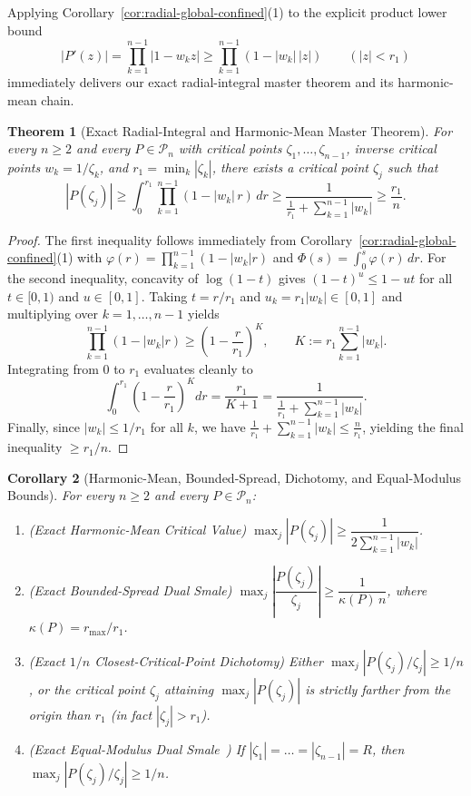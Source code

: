 \documentclass[11pt,a4paper]{article}
\newtheorem{theorem}{Theorem}[section]
\newtheorem{corollary}[theorem]{Corollary}
\theoremstyle{definition}
\theoremstyle{remark}
\begin{document}
Applying Corollary~\ref{cor:radial-global-confined}(1) to the explicit product lower bound
\[
|P'(z)| = \prod_{k=1}^{n-1} |1 - w_k z| \ge \prod_{k=1}^{n-1} (1 - |w_k|\, |z|) \qquad (|z| < r_1)
\]
immediately delivers our exact radial-integral master theorem and its harmonic-mean chain.

\begin{theorem}[Exact Radial-Integral and Harmonic-Mean Master Theorem]
\label{thm:exact-master}
For every $n \ge 2$ and every $P \in \mathcal{P}_n$ with critical points $\zeta_1, \dots, \zeta_{n-1}$, inverse critical points $w_k = 1/\zeta_k$, and $r_1 = \min_k |\zeta_k|$, there exists a critical point $\zeta_j$ such that
\begin{equation}
\label{eq:master-chain}
|P(\zeta_j)| \ge \int_0^{r_1} \prod_{k=1}^{n-1} (1 - |w_k|\, r)\, dr \ge \frac{1}{\frac{1}{r_1} + \sum_{k=1}^{n-1} |w_k|} \ge \frac{r_1}{n}.
\end{equation}
\end{theorem}

\begin{proof}
The first inequality follows immediately from Corollary~\ref{cor:radial-global-confined}(1) with $\varphi(r) = \prod_{k=1}^{n-1} (1 - |w_k| r)$ and $\Phi(s) = \int_0^s \varphi(r)\, dr$. For the second inequality, concavity of $\log(1 - t)$ gives $(1 - t)^u \le 1 - u t$ for all $t \in [0, 1)$ and $u \in [0, 1]$. Taking $t = r/r_1$ and $u_k = r_1 |w_k| \in [0, 1]$ and multiplying over $k = 1, \dots, n - 1$ yields
\[
\prod_{k=1}^{n-1} (1 - |w_k| r) \ge \left(1 - \frac{r}{r_1}\right)^K, \qquad K := r_1 \sum_{k=1}^{n-1} |w_k|.
\]
Integrating from $0$ to $r_1$ evaluates cleanly to
\[
\int_0^{r_1} \left(1 - \frac{r}{r_1}\right)^K dr = \frac{r_1}{K + 1} = \frac{1}{\frac{1}{r_1} + \sum_{k=1}^{n-1} |w_k|}.
\]
Finally, since $|w_k| \le 1/r_1$ for all $k$, we have $\frac{1}{r_1} + \sum_{k=1}^{n-1} |w_k| \le \frac{n}{r_1}$, yielding the final inequality $\ge r_1/n$.
\end{proof}

\begin{corollary}[Harmonic-Mean, Bounded-Spread, Dichotomy, and Equal-Modulus Bounds]
\label{cor:exact-corollaries}
For every $n \ge 2$ and every $P \in \mathcal{P}_n$:
\begin{enumerate}
\item \emph{(Exact Harmonic-Mean Critical Value)} $\max_j |P(\zeta_j)| \ge \dfrac{1}{2 \sum_{k=1}^{n-1} |w_k|}$.
\item \emph{(Exact Bounded-Spread Dual Smale)} $\max_j \left|\dfrac{P(\zeta_j)}{\zeta_j}\right| \ge \dfrac{1}{\kappa(P)\, n}$, where $\kappa(P) = r_{\max}/r_1$.
\item \emph{(Exact $1/n$ Closest-Critical-Point Dichotomy)} Either $\max_j |P(\zeta_j)/\zeta_j| \ge 1/n$, or the critical point $\zeta_j$ attaining $\max_j |P(\zeta_j)|$ is strictly farther from the origin than $r_1$ (in fact $|\zeta_j| > r_1$).
\item \emph{(Exact Equal-Modulus Dual Smale~\cite{Ng2003,DubininSugawa2009})} If $|\zeta_1| = \dots = |\zeta_{n-1}| = R$, then $\max_j |P(\zeta_j)/\zeta_j| \ge 1/n$.
\end{enumerate}
\end{corollary}
\end{document}
